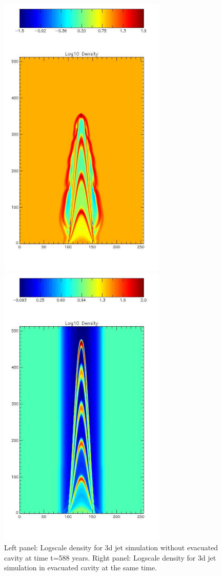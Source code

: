 \begin{figure}[t]
\begin{center}
\begin{minipage}[t]{.48\linewidth}
\includegraphics[width=8cm]{3dnogradden}
\end{minipage} \hfill
\begin{minipage}[t]{.48\linewidth}
\includegraphics[width=8cm]{3dgradden}
\end{minipage}
\caption{ 
Left panel: Logscale density for 3d jet simulation without evacuated cavity 
at time t=588 years.
Right panel: Logscale density for 3d jet simulation in evacuated cavity 
at the same time.
}
\label{fig:3DDensity}       %
\end{center}
\end{figure}

